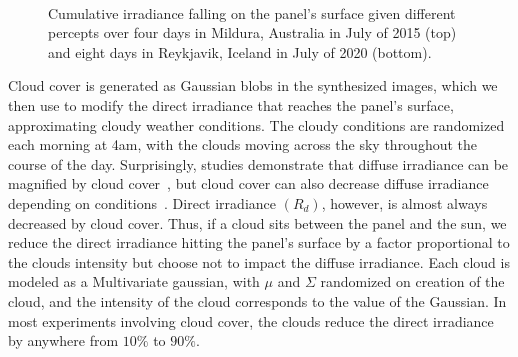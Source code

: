 \documentclass{article}
\begin{document}
{\begin{figure}[t]
\begin{center}
	 \\ %
\caption{Cumulative irradiance falling on the panel's surface given different percepts over four days in Mildura, Australia in July of 2015 (top) and eight days in Reykjavik, Iceland in July of 2020 (bottom).}
\label{fig:results_aus}
\end{center}
\end{figure}


Cloud cover is generated as Gaussian blobs in the synthesized images, which we then use to modify the direct irradiance that reaches the panel's surface, approximating cloudy weather conditions. The cloudy conditions are randomized each morning at 4am, with the clouds moving across the sky throughout the course of the day. Surprisingly, studies demonstrate that diffuse irradiance can be magnified by cloud cover~\cite{robinson1966solar}, but cloud cover can also decrease diffuse irradiance depending on conditions~\cite{pfister2003cloud}. Direct irradiance $(R_d)$, however, is almost always decreased by cloud cover. Thus, if a cloud sits between the panel and the sun, we reduce the direct irradiance hitting the panel's surface by a factor proportional to the clouds intensity but choose not to impact the diffuse irradiance. Each cloud is modeled as a Multivariate gaussian, with $\mu$ and $\Sigma$ randomized on creation of the cloud, and the intensity of the cloud corresponds to the value of the Gaussian. In most experiments involving cloud cover, the clouds reduce the direct irradiance by anywhere from $10\%$ to $90\%$.



}
\end{document}
